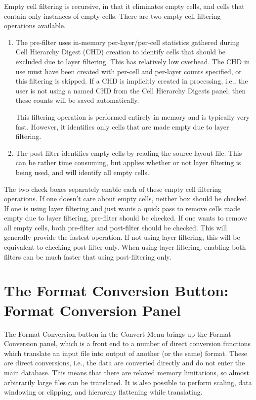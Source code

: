 Empty cell filtering is recursive, in that it eliminates empty cells,
and cells that contain only instances of empty cells.  There are two
empty cell filtering operations available.

\begin{enumerate}
\item{
The {\cb pre-filter} uses in-memory per-layer/per-cell
statistics gathered during Cell Hierarchy Digest (CHD) creation to
identify cells that should be excluded due to layer filtering.  This
has relatively low overhead.  The CHD in use must have been created
with {\cb per-cell and per-layer counts} specified, or this filtering
is skipped.  If a CHD is implicitly created in processing, i.e., the
user is not using a named CHD from the {\cb Cell Hierarchy Digests}
panel, then these counts will be saved automatically.

This filtering operation is performed entirely in memory and is
typically very fast.  However, it identifies only cells that are
made empty due to layer filtering. }

\item{
The {\cb post-filter} identifies empty cells by reading the source
layout file.  This can be rather time consuming, but applies whether
or not layer filtering is being used, and will identify all empty
cells. }
\end{enumerate}

The two check boxes separately enable each of these empty cell
filtering operations.  If one doesn't care about empty cells, neither
box should be checked.  If one is using layer filtering and just wants
a quick pass to remove cells made empty due to layer filtering, {\cb
pre-filter} should be checked.  If one wants to remove all empty
cells, both {\cb pre-filter} and {\cb post-filter} should be checked. 
This will generally provide the fastest operation.  If not using layer
filtering, this will be equivalent to checking {\cb post-filter} only. 
When using layer filtering, enabling both filters can be much faster
that using post-filtering only.


\section{The {\cb Format Conversion} Button: {\cb Format Conversion} Panel}

The {\cb Format Conversion} button in the {\cb Convert Menu} brings up
the {\cb Format Conversion} panel, which is a front end to a number of
direct conversion functions which translate an input file into output
of another (or the same) format.  These are direct conversions, i.e.,
the data are converted directly and do not enter the main {\Xic}
database.  This means that there are relaxed memory limitations, so
almost arbitrarily large files can be translated.  It is also possible
to perform scaling, data windowing or clipping, and hierarchy
flattening while translating.

